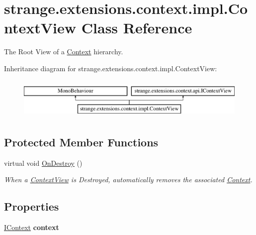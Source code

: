 \hypertarget{classstrange_1_1extensions_1_1context_1_1impl_1_1_context_view}{\section{strange.\-extensions.\-context.\-impl.\-Context\-View Class Reference}
\label{classstrange_1_1extensions_1_1context_1_1impl_1_1_context_view}
}


The Root View of a \hyperlink{classstrange_1_1extensions_1_1context_1_1impl_1_1_context}{Context} hierarchy.  


Inheritance diagram for strange.\-extensions.\-context.\-impl.\-Context\-View\-:\begin{figure}[H]
\begin{center}
\leavevmode
\includegraphics[height=2.000000cm]{classstrange_1_1extensions_1_1context_1_1impl_1_1_context_view}
\end{center}
\end{figure}
\subsection*{Protected Member Functions}
\begin{DoxyCompactItemize}
\item 
virtual void \hyperlink{classstrange_1_1extensions_1_1context_1_1impl_1_1_context_view_a3a41e584731cc8e98f478427e2710d9a}{On\-Destroy} ()
\begin{DoxyCompactList}\small\item\em When a \hyperlink{classstrange_1_1extensions_1_1context_1_1impl_1_1_context_view}{Context\-View} is Destroyed, automatically removes the associated \hyperlink{classstrange_1_1extensions_1_1context_1_1impl_1_1_context}{Context}. \end{DoxyCompactList}\end{DoxyCompactItemize}
\subsection*{Properties}
\begin{DoxyCompactItemize}
\item 
\hypertarget{classstrange_1_1extensions_1_1context_1_1impl_1_1_context_view_ae5bb756aecf7d6e310642b43f2a2af6c}{\hyperlink{interfacestrange_1_1extensions_1_1context_1_1api_1_1_i_context}{I\-Context} {\bfseries context}}\label{classstrange_1_1extensions_1_1context_1_1impl_1_1_context_view_ae5bb756aecf7d6e310642b43f2a2af6c}

\end{DoxyCompactItemize}


